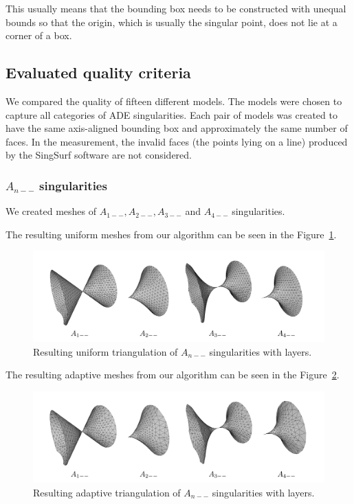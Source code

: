This usually means that the bounding box needs to be constructed with unequal bounds 
so that the origin, which is usually the singular point, does not lie at a corner of a box.

\clearpage
\subsection{Evaluated quality criteria}
We compared the quality of fifteen different models. The models were chosen
to capture all categories of ADE singularities. Each pair of models was 
created to have the same axis-aligned bounding box and approximately the
same number of faces. In the measurement, the invalid faces 
(the points lying on a line) produced by the SingSurf software are not considered.

\subsubsection*{$A_{n--}$ singularities}
We created meshes of $A_{1--}, A_{2--}, A_{3--}$ and $A_{4--}$ singularities.

The resulting uniform meshes from our algorithm can be seen in the 
Figure~\ref{img:61}.
\begin{figure}[h!]
    \centerline{\includegraphics[scale=0.24]{images/img61}}
    \caption[Resulting uniform triangulation of $A_{n--}$ singularities]
    {Resulting uniform triangulation of $A_{n--}$ singularities with layers.}
    \label{img:61}
\end{figure} 

The resulting adaptive meshes from our algorithm can be seen in the 
Figure~\ref{img:60}.
\begin{figure}[h!]
    \centerline{\includegraphics[scale=0.5]{images/img60}}
    \caption[Resulting adaptive triangulation of $A_{n--}$ singularities]
    {Resulting adaptive triangulation of $A_{n--}$ singularities with layers.}
    \label{img:60}
\end{figure}

